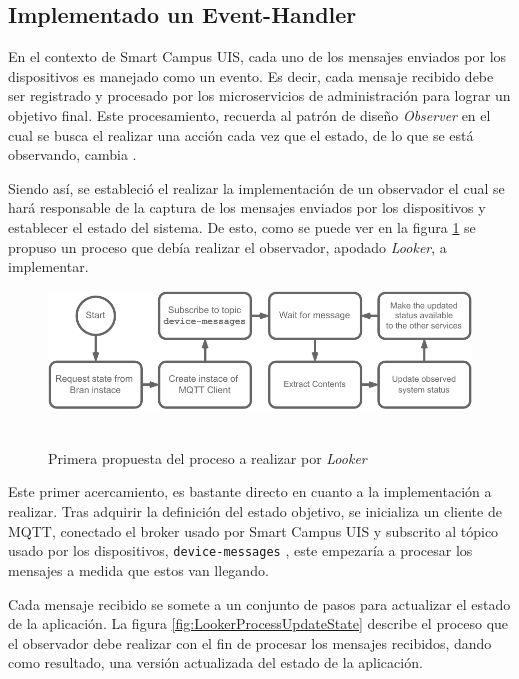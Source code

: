 
\subsection{Implementado un Event-Handler}

En el contexto de Smart Campus UIS, cada uno de los mensajes enviados por los dispositivos es manejado como un evento. Es decir, cada mensaje recibido debe ser registrado y procesado por los microservicios de administración para lograr un objetivo final. Este procesamiento, recuerda al patrón de diseño \textit{Observer} en el cual se busca el realizar una acción cada vez que el estado, de lo que se está observando, cambia \cite{Shvets2019}.

Siendo así, se estableció el realizar la implementación de un observador el cual se hará responsable de la captura de los mensajes enviados por los dispositivos y establecer el estado del sistema. De esto, como se puede ver en la figura \ref{fig:procesoLooker} se propuso un proceso que debía realizar el observador, apodado \textit{Looker}, a implementar.

\begin{figure}[ht]
    \caption{\\Primera propuesta del proceso a realizar por \textit{Looker}} 
    \centering
    \includegraphics[width=\linewidth]{images/LookerProcess.pdf}
    \label{fig:procesoLooker}
\end{figure} 

Este primer acercamiento, es bastante directo en cuanto a la implementación a realizar. Tras adquirir la definición del estado objetivo, se inicializa un cliente de MQTT, conectado el broker usado por Smart Campus UIS y subscrito al tópico usado por los dispositivos, \texttt{device-messages} \cite{SmartCampusGithub}, este empezaría a procesar los mensajes a medida que estos van llegando. 

Cada mensaje recibido se somete a un conjunto de pasos para actualizar el estado de la aplicación. La figura \ref{fig:LookerProcessUpdateState} describe el proceso que el observador debe realizar con el fin de procesar los mensajes recibidos, dando como resultado, una versión actualizada del estado de la aplicación. 

